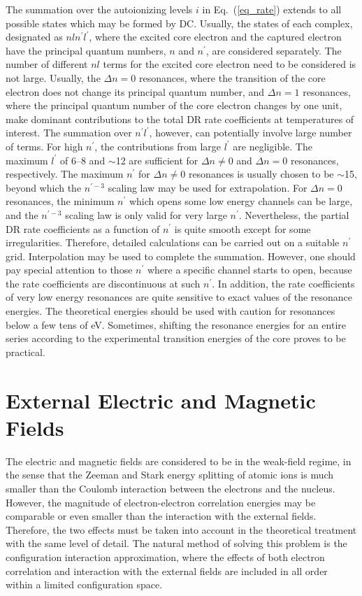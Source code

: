 The summation over the autoionizing levels $i$ in Eq.~(\ref{eq_rate})
extends to all possible states which may be formed by DC. Usually, the states
of each 
complex, designated as $nln^\prime l^\prime$, where the excited core electron
and the captured electron have the principal quantum numbers, $n$ and
$n^\prime$, are considered separately. 
The number of different $nl$ terms for the excited core
electron need to be considered is not large. Usually, the $\Delta n = 0$
resonances, where the transition of the core electron does not change its
principal quantum number, and $\Delta n = 1$ resonances, where the principal
quantum number of the core electron changes by one unit, make
dominant contributions to the 
total DR rate coefficients at temperatures of interest. The summation
over $n^\prime l^\prime$, however, can potentially involve large number of
terms. For high $n^\prime$, the contributions from large $l^\prime$ are
negligible. The maximum $l^\prime$ of 6--8 and $\sim$12 are sufficient for
$\Delta n \ne 0$ and $\Delta n = 0$ resonances, respectively. The maximum
$n^\prime$ for $\Delta n \ne 0$ resonances is usually chosen to be $\sim$15,
beyond which the $n^{\prime -3}$ scaling law may be used for
extrapolation. For $\Delta n = 0$ resonances, the minimum $n^\prime$ which
opens some low energy channels can be large, and the $n^{\prime -3}$ scaling
law is only valid for very large $n^\prime$. Nevertheless, the partial DR rate
coefficients as a function of $n^\prime$ is quite smooth except for some
irregularities. Therefore, detailed 
calculations can be carried out on a suitable $n^\prime$ grid.
Interpolation may be used to complete the summation. However, one should pay
special attention to those $n^\prime$ where a specific channel starts to
open, because the rate coefficients are discontinuous at such $n^\prime$. In
addition, the rate coefficients of very low energy resonances are quite
sensitive to exact values of the resonance energies. The theoretical
energies should be used with caution for resonances below a few tens of
eV. Sometimes, shifting the resonance energies for an entire series according
to the experimental transition energies of the core proves to be practical.

\section{External Electric and Magnetic Fields}
The electric and magnetic fields are considered to be in the weak-field regime,
in the sense that the  Zeeman and Stark energy splitting of atomic ions is much
smaller than the Coulomb interaction between the electrons and the nucleus.
However, the magnitude of electron-electron correlation energies may be
comparable or even smaller than the interaction with the external fields.
Therefore, the two effects must be taken into account in the theoretical
treatment with the same level of detail. The natural method of solving this
problem is the configuration interaction approximation, where the effects of
both electron correlation and interaction with the external fields are included
in all order within a limited configuration space.

